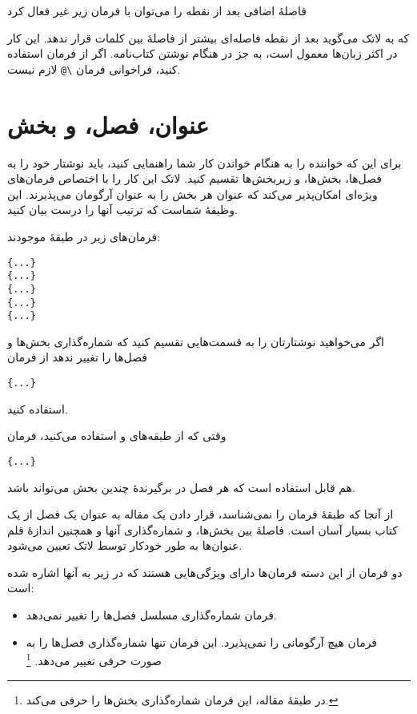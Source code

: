 فاصلهٔ اضافی بعد از نقطه را می‌توان با فرمان زیر غیر فعال کرد
\begin{lscommand}
\end{lscommand}
\noindent 
که به لاتک می‌گوید بعد از نقطه فاصله‌ای بیشتر از فاصلهٔ بین کلمات قرار ندهد. این کار در اکثر زبان‌ها معمول است، به جز در هنگام نوشتن کتاب‌نامه. اگر از فرمان 
استفاده کنید، فراخوانی فرمان 
\verb|\@|
لازم نیست.
\section{عنوان، فصل، و بخش}
برای این که خواننده را به هنگام خواندن کار شما راهنمایی کنید، باید نوشتار خود را به فصل‌ها، بخش‌ها، و زیربخش‌ها تقسیم کنید. لاتک این کار را با اختصاص فرمان‌های ویژه‌ای امکان‌پذیر می‌کند که عنوان هر بخش را به عنوان آرگومان می‌پذیرند. این وظیفهٔ شماست که ترتیب آنها را درست بیان کنید.

فرمان‌های زیر در طبقهٔ 
موجودند:
 \nopagebreak

\begin{lscommand}
\verb|{...}|\\
\verb|{...}|\\
\verb|{...}|\\
\verb|{...}|\\
\verb|{...}|
\end{lscommand}

اگر می‌خواهید نوشتارتان را به قسمت‌هایی تقسیم کنید که شماره‌گذاری بخش‌ها و فصل‌ها را تغییر ندهد از فرمان 
\begin{lscommand}
\verb|{...}|
\end{lscommand}
\noindent استفاده کنید.

وقتی که از طبقه‌های 
و
استفاده می‌کنید، فرمان 
\begin{lscommand}
\verb|{...}|
\end{lscommand}
\noindent هم قابل استفاده است که هر فصل در برگیرندهٔ  چندین بخش می‌تواند باشد.

از آنجا که طبقهٔ 
فرمان 
را نمی‌شناسد، قرار دادن یک مقاله به عنوان یک فصل از یک کتاب بسیار آسان است. فاصلهٔ بین بخش‌ها، و شماره‌گذاری‌ آنها و همچنین اندازهٔ قلم عنوان‌ها به طور خودکار توسط لاتک تعیین می‌شود.

دو فرمان از این دسته فرمان‌ها دارای ویژگی‌هایی هستند که در زیر به آنها اشاره شده است:

\begin{itemize}
\item 
فرمان 
شماره‌گذاری مسلسل فصل‌ها را تغییر نمی‌دهد.
\item 
فرمان 
هیچ آرگومانی را نمی‌پذیرد. این فرمان تنها شماره‌گذاری فصل‌ها را به صورت حرفی تغییر می‌دهد.%
\footnote{در طبقهٔ مقاله، این فرمان شماره‌گذاری بخش‌ها را حرفی می‌کند.}
\end{itemize}


